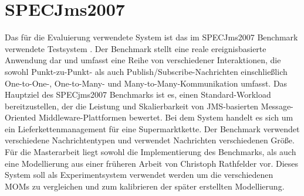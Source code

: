 
\section{SPECJms2007}
Das für die Evaluierung verwendete System ist das im SPECJms2007 Benchmark verwendete Testsystem \cite{Sachs2013}. Der Benchmark stellt eine reale ereignisbasierte Anwendung dar und umfasst eine Reihe von verschiedener Interaktionen, die sowohl Punkt-zu-Punkt- als auch Publish/Subscribe-Nachrichten einschließlich One-to-One-, One-to-Many- und Many-to-Many-Kommunikation umfasst. Das Hauptziel des SPECjms2007 Benchmarks ist es, einen Standard-Workload bereitzustellen, der die Leistung und Skalierbarkeit von JMS-basierten Message-Oriented Middleware-Plattformen bewertet. Bei dem System handelt es sich um ein Lieferkettenmanagement für eine Supermarktkette. Der Benchmark verwendet verschiedene Nachrichtentypen und verwendet Nachrichten verschiedenen Größe. Für die Masterarbeit liegt sowohl die Implementierung des Benchmarks, als auch eine Modellierung aus einer früheren Arbeit von Christoph Rathfelder \cite{Rathfelder2013} vor. Dieses System soll als Experimentsystem verwendet werden um die verschiedenen MOMs zu vergleichen und zum kalibrieren der später erstellten Modellierung. 

